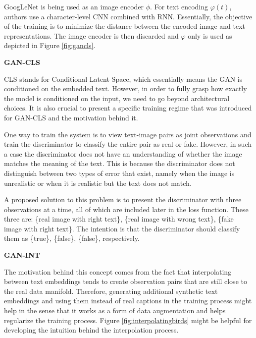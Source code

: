 \documentclass[
]{krantz}
\begin{document}
GoogLeNet is being used as an image encoder \(\phi\). For text encoding \(\varphi(t)\), authors use a character-level CNN combined with RNN. Essentially, the objective of the training is to minimize the distance between the encoded image and text representations. The image encoder is then discarded and \(\varphi\) only is used as depicted in Figure \ref{fig:gancls}.

\textbf{GAN-CLS}

CLS stands for Conditional Latent Space, which essentially means the GAN is conditioned on the embedded text. However, in order to fully grasp how exactly the model is conditioned on the input, we need to go beyond architectural choices. It is also crucial to present a specific training regime that was introduced for GAN-CLS and the motivation behind it.

One way to train the system is to view text-image pairs as joint observations and train the discriminator to classify the entire pair as real or fake. However, in such a case the discriminator does not have an understanding of whether the image matches the meaning of the text. This is because the discriminator does not distinguish between two types of error that exist, namely when the image is unrealistic or when it is realistic but the text does not match.

A proposed solution to this problem is to present the discriminator with three observations at a time, all of which are included later in the loss function. These three are: \{real image with right text\}, \{real image with wrong text\}, \{fake image with right text\}. The intention is that the discriminator should classify them as \{true\}, \{false\}, \{false\}, respectively.

\textbf{GAN-INT}

The motivation behind this concept comes from the fact that interpolating between text embeddings tends to create observation pairs that are still close to the real data manifold. Therefore, generating additional synthetic text embeddings and using them instead of real captions in the training process might help in the sense that it works as a form of data augmentation and helps regularize the training process. Figure \ref{fig:interpolatingbirds} might be helpful for developing the intuition behind the interpolation process.
\end{document}
